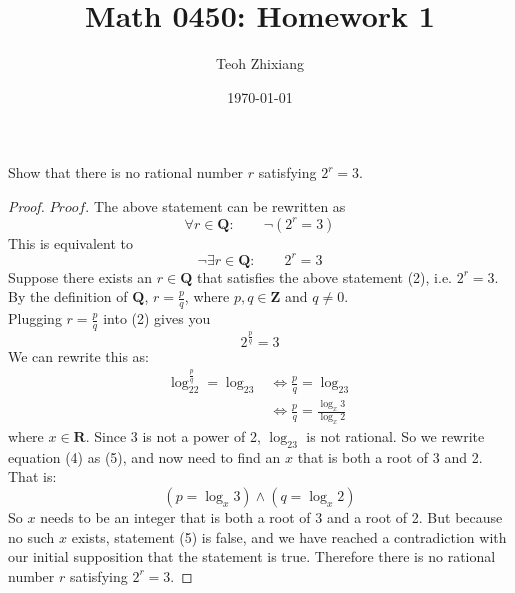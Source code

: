 \documentclass{article}
\begin{document}
\title{Math 0450: Homework 1}
\date{\today}
\author{Teoh Zhixiang}

\maketitle

\begin{Prob}[Ex. 1.2.2]
Show that there is no rational number $r$ satisfying $2^r=3$.
\end{Prob}

\begin{proof}
$Proof.$ The above statement can be rewritten as
\begin{equation}
    \forall r \in \mathbf{Q}: \qquad \neg(2^r = 3)
\end{equation}
This is equivalent to
\begin{equation}
    \neg \exists r \in \mathbf{Q}: \qquad 2^r = 3
\end{equation}
Suppose there exists an $r \in \mathbf{Q}$ that satisfies the above statement (2), i.e. $2^r = 3$. By the definition of $\mathbf{Q}$, $r = \frac{p}{q}$, where $p, q \in \mathbf{Z}$ and $q \neq 0$. \\
Plugging $r = \frac{p}{q}$ into (2) gives you
\begin{equation}
    2^\frac{p}{q} = 3
\end{equation}
We can rewrite this as:
\begin{align}
    \log_22^\frac{p}{q} = \log_23 & \iff \frac{p}{q} = \log_23 \\
    & \iff \frac{p}{q} = \frac{\log_x3}{\log_x2}
\end{align}
where $x \in \mathbf{R}$. Since 3 is not a power of 2, $\log_23$ is not rational. So we rewrite equation (4) as (5), and now need to find an $x$ that is both a root of 3 and 2. That is:
\begin{equation}
    (p = \log_x3) \wedge (q = \log_x2)
\end{equation}
So $x$ needs to be an integer that is both a root of 3 and a root of 2. But because no such $x$ exists, statement (5) is false, and we have reached a contradiction with our initial supposition that the statement is true. Therefore there is no rational number $r$ satisfying $2^r = 3$.
\end{proof}
\\
\par
\end{document}
